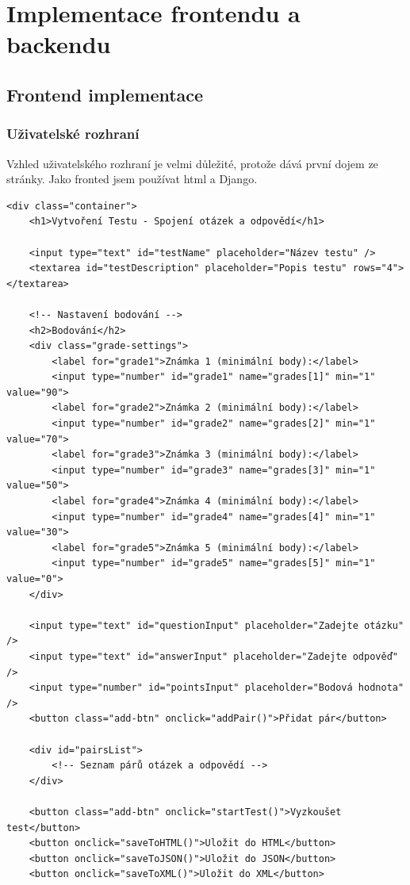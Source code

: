 \documentclass[12pt, a4paper, twoside, openright]{report}
\begin{document}
\chapter{Implementace frontendu a backendu}
	\section{Frontend implementace}
	\subsection{Uživatelské rozhraní}
	Vzhled uživatelského rozhraní je velmi důležité, protože dává první dojem ze stránky. Jako fronted jsem používat html a Django.
\begin{lstlisting}[style=Python]
<div class="container">
    <h1>Vytvoření Testu - Spojení otázek a odpovědí</h1>

    <input type="text" id="testName" placeholder="Název testu" />
    <textarea id="testDescription" placeholder="Popis testu" rows="4"></textarea>

    <!-- Nastavení bodování -->
    <h2>Bodování</h2>
    <div class="grade-settings">
        <label for="grade1">Známka 1 (minimální body):</label>
        <input type="number" id="grade1" name="grades[1]" min="1" value="90">
        <label for="grade2">Známka 2 (minimální body):</label>
        <input type="number" id="grade2" name="grades[2]" min="1" value="70">
        <label for="grade3">Známka 3 (minimální body):</label>
        <input type="number" id="grade3" name="grades[3]" min="1" value="50">
        <label for="grade4">Známka 4 (minimální body):</label>
        <input type="number" id="grade4" name="grades[4]" min="1" value="30">
        <label for="grade5">Známka 5 (minimální body):</label>
        <input type="number" id="grade5" name="grades[5]" min="1" value="0">
    </div>

    <input type="text" id="questionInput" placeholder="Zadejte otázku" />
    <input type="text" id="answerInput" placeholder="Zadejte odpověď" />
    <input type="number" id="pointsInput" placeholder="Bodová hodnota" />
    <button class="add-btn" onclick="addPair()">Přidat pár</button>

    <div id="pairsList">
        <!-- Seznam párů otázek a odpovědí -->
    </div>

    <button class="add-btn" onclick="startTest()">Vyzkoušet test</button>
    <button onclick="saveToHTML()">Uložit do HTML</button>
    <button onclick="saveToJSON()">Uložit do JSON</button>
    <button onclick="saveToXML()">Uložit do XML</button>



\end{lstlisting}
\end{document}

